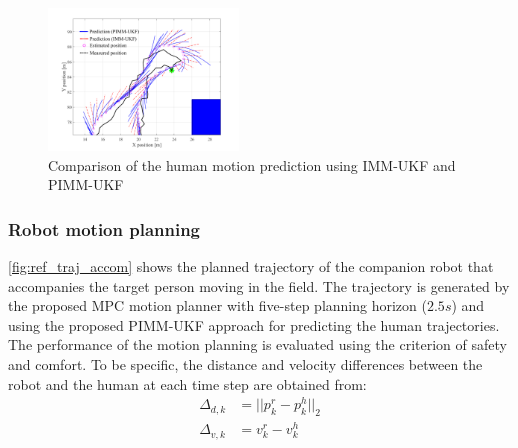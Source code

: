 \documentclass[journal]{IEEEtran}
\begin{document}
	\begin{figure}
		\centering
		\includegraphics[width=0.45\textwidth]{figures/Human_motion_prediction_zoom3}
		\caption{Comparison of the human motion prediction using IMM-UKF and PIMM-UKF}
		\label{fig:prediction_zoom1}
	\end{figure}	
    
	\subsubsection{Robot motion planning}\label{subsubsec:motion_plan}
	\cref{fig:ref_traj_accom} shows the planned trajectory of the companion robot that accompanies the target person moving in the field. The trajectory is generated by the proposed MPC motion planner with five-step planning horizon ($2.5s$) and using the proposed PIMM-UKF approach for predicting the human trajectories.
	The performance of the motion planning is evaluated using the criterion of safety and comfort.
	To be specific, the distance and velocity differences between the robot and the human at each time step are obtained from:
	\begin{subequations}
		\begin{align}
			\Delta_{d,k}&=||p^r_k-p^h_k||_2\nonumber\\ 
			\Delta_{v,k}&=v^r_k-v^h_k \nonumber
		\end{align}
	\end{subequations}
    \normalsize
	
\end{document}

